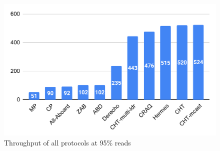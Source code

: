 \begin{figure}[t]
  \centering
  \includegraphics[scale=0.4]{1_figures/5perc-writes.pdf}
  \caption{Throughput of all protocols at 95\% reads}
  \label{fig:5perc}
\end{figure}